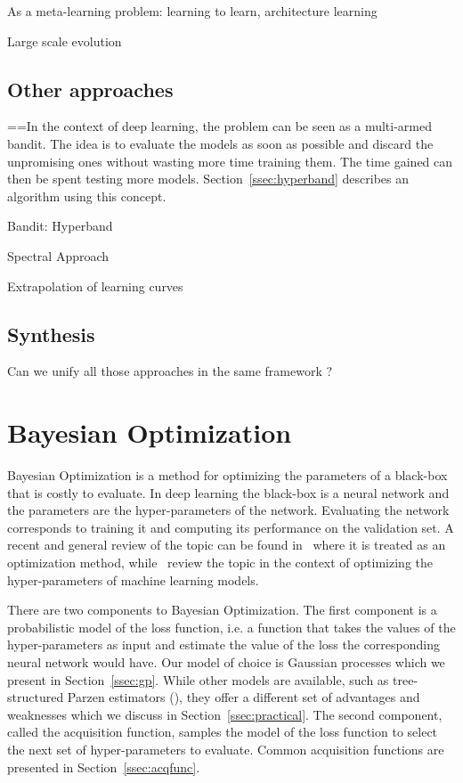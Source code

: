 As a meta-learning problem: learning to learn, architecture learning

Large scale evolution

\subsection{Other approaches}

==In the context of deep learning, the problem can be seen as a multi-armed bandit. The idea is to evaluate the models as soon as possible and discard the unpromising ones without wasting more time training them. The time gained can then be spent testing more models. Section~\ref{ssec:hyperband} describes an algorithm using this concept.

Bandit: Hyperband~\textcite{li2017ICLR}

Spectral Approach~\textcite{hazan2018ICLR}

Extrapolation of learning curves

\subsection{Synthesis}

Can we unify all those approaches in the same framework ?

\section{Bayesian Optimization}
\label{sec:bo}

Bayesian Optimization is a method for optimizing the parameters of a black-box that is costly to evaluate. In deep learning the black-box is a neural network and the parameters are the hyper-parameters of the network. Evaluating the network corresponds to training it and computing its performance on the validation set. A recent and general review of the topic can be found in~\textcite{shahriari2016IEEE} where it is treated as an optimization method, while~\textcite{snoek2012NIPS} review the topic in the context of optimizing the hyper-parameters of machine learning models.

There are two components to Bayesian Optimization. The first component is a probabilistic model of the loss function, i.e. a function that takes the values of the hyper-parameters as input and estimate the value of the loss the corresponding neural network would have. Our model of choice is Gaussian processes which we present in Section~\ref{ssec:gp}. While other models are available, such as tree-structured Parzen estimators (\textcite{bergstra2011NIPS}), they offer a different set of advantages and weaknesses which we discuss in Section~\ref{ssec:practical}. The second component, called the acquisition function, samples the model of the loss function to select the next set of hyper-parameters to evaluate. Common acquisition functions are presented in Section~\ref{ssec:acqfunc}.

